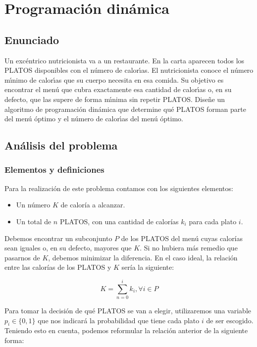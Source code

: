 \chapter{Programación dinámica}\label{programacion-dinamica}

\section{Enunciado}\label{pd-enunciado}

Un excéntrico nutricionista va a un restaurante.
En la carta aparecen todos los PLATOS disponibles con el número de calorı́as.
El nutricionista conoce el número mı́nimo de calorı́as que su cuerpo necesita en esa comida.
Su objetivo es encontrar el menú que cubra exactamente esa cantidad de calorı́as o, en su defecto, que las supere de forma mı́nima sin repetir PLATOS\@.
Diseñe un algoritmo de programación dinámica que determine qué PLATOS forman parte del menú óptimo y el número de calorı́as del menú óptimo.

\section{Análisis del problema}\label{pd-analisis}

\subsection{Elementos y definiciones}\label{pd-elementos-y-definiciones}

Para la realización de este problema contamos con los siguientes elementos:

\begin{itemize}
	\item Un número $K$ de caloría a alcanzar.
	\item Un total de $n$ PLATOS, con una cantidad de calorías $k_i$ para cada plato $i$.
\end{itemize}

Debemos encontrar un subconjunto $P$ de los PLATOS del menú cuyas calorías sean iguales o, en su defecto, mayores que $K$.
Si no hubiera más remedio que pasarnos de $K$, debemos minimizar la diferencia.
En el caso ideal, la relación entre las calorías de los PLATOS y $K$ sería la siguiente:

\[K=\sum_{n=0}^{i}k_i,\forall i\in P\]

Para tomar la decisión de qué PLATOS se van a elegir, utilizaremos una variable $p_i\in\{0,1\}$ que nos indicará la probabilidad que tiene cada plato $i$ de ser escogido.
Teniendo esto en cuenta, podemos reformular la relación anterior de la siguiente forma:


